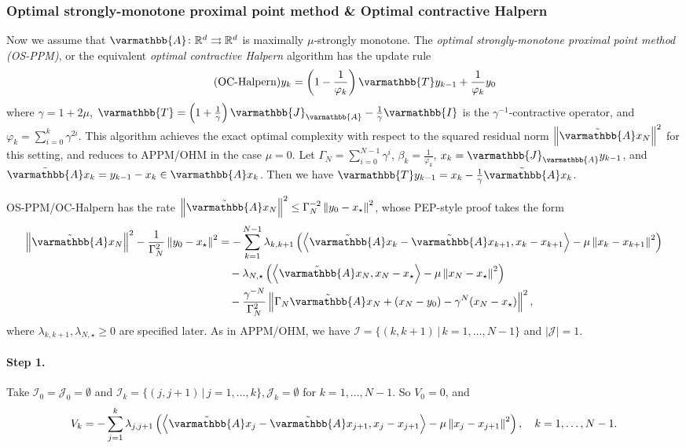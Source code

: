 \documentclass{article}
\theoremstyle{definition}
\theoremstyle{plain}
\newcommand{\cI}{{\mathcal{I}}}
\newcommand{\cJ}{{\mathcal{J}}}
\newcommand{\reals}{\mathbb{R}}
\newcommand{\opA}{{\varmathbb{A}}}
\newcommand{\opI}{{\varmathbb{I}}}
\newcommand{\opJ}{{\varmathbb{J}}}
\newcommand{\opT}{{\varmathbb{T}}}
\newcommand{\inprod}[2]{\left\langle #1,#2 \right\rangle}
\newcommand{\sqnorm}[1]{\left\| #1 \right\|^2}
\newcommand{\topa}{\tilde{\opA}}
\begin{document}
\subsubsection{Optimal strongly-monotone proximal point method \& Optimal contractive Halpern}
\label{section:os-ppm-and-oc-halpern}

Now we assume that $\opA\colon \reals^d \rightrightarrows \reals^d$ is maximally $\mu$-strongly monotone.
The \emph{optimal strongly-monotone proximal point method (OS-PPM)}, or the equivalent 
\emph{optimal contractive Halpern} algorithm \citep{ParkRyu2022_exact} has the update rule 
\begin{align}
\label{alg:oc-halpern}
\tag{OC-Halpern}
    y_k = \left(1 - \frac{1}{\varphi_k} \right) \opT y_{k-1} + \frac{1}{\varphi_k} y_0
\end{align}
where $\gamma=1+2\mu$, $\opT = \left(1 + \frac{1}{\gamma}\right) \opJ_\opA - \frac{1}{\gamma} \opI$ is the $\gamma^{-1}$-contractive operator, and $\varphi_k = \sum_{i=0}^k \gamma^{2i}$.
This algorithm achieves the exact optimal complexity with respect to the squared residual norm $\sqnorm{\topa x_N}$ for this setting, and reduces to APPM/OHM in the case $\mu=0$.
Let $\Gamma_N=\sum_{i=0}^{N-1}\gamma^i$, $\beta_k=\frac{1}{\varphi_k}$, $x_k = \opJ_\opA y_{k-1}$, and $\topa x_k = y_{k-1}-x_k\in\opA x_k$.
Then we have $\opT y_{k-1}=x_k-\frac{1}{\gamma}\topa x_k$.

OS-PPM/OC-Halpern has the rate 
\(\sqnorm{\topa x_N}\le \Gamma_N^{-2}\sqnorm{y_0-x_\star}\),
whose PEP-style proof takes the form
\begin{align}
\label{eqn:oc-halpern-pep-proof}
    \sqnorm{\topa x_N}-\frac{1}{\Gamma_N^2}\sqnorm{y_0-x_\star}
    &=
    -\sum_{k=1}^{N-1}\lambda_{k,k+1}
    \left(
    \inprod{\topa x_k-\topa x_{k+1}}{x_k-x_{k+1}}
    -\mu\sqnorm{x_k-x_{k+1}}
    \right) \notag\\
    &\quad
    -\lambda_{N,\star}
    \left(
    \inprod{\topa x_N}{x_N-x_\star}
    -\mu\sqnorm{x_N-x_\star}
    \right) \notag\\
    &\quad
    -\frac{\gamma^{-N}}{\Gamma_N^2}
    \sqnorm{\Gamma_N \topa x_N+(x_N-y_0)-\gamma^N(x_N-x_\star)},
\end{align}
where $\lambda_{k,k+1}, \lambda_{N,\star} \ge 0$ are specified later.
As in APPM/OHM, we have $\cI = \{(k,k+1)\,|\,k=1,\dots,N-1\}$ and $|\cJ| = 1$. 

\paragraph{Step 1.}
Take $\cI_0=\cJ_0=\emptyset$ and $\cI_k=\{(j,j+1)\,|\,j=1,\dots,k\}, \cJ_k=\emptyset$ for $k=1,\dots,N-1$.
So $V_0=0$, and
\[
    V_k = -\sum_{j=1}^{k}\lambda_{j,j+1} \left(
    \inprod{\topa x_j-\topa x_{j+1}}{x_j-x_{j+1}}
    -\mu\sqnorm{x_j-x_{j+1}}
    \right) , 
    \quad k=1,\dots,N-1 .
\]
\end{document}
